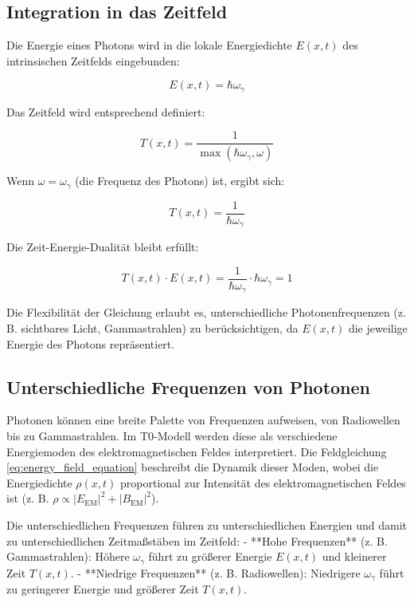 	\subsection{Integration in das Zeitfeld}
	\label{subsec:photon_time_field}
	
	Die Energie eines Photons wird in die lokale Energiedichte \( E(x,t) \) des intrinsischen Zeitfelds eingebunden:
	
	\begin{equation}
		E(x,t) = \hbar \omega_\gamma
	\end{equation}
	
	Das Zeitfeld wird entsprechend definiert:
	
	\begin{equation}
		T(x,t) = \frac{1}{\max(\hbar \omega_\gamma, \omega)}
	\end{equation}
	
	Wenn \(\omega = \omega_\gamma\) (die Frequenz des Photons) ist, ergibt sich:
	
	\begin{equation}
		T(x,t) = \frac{1}{\hbar \omega_\gamma}
	\end{equation}
	
	Die Zeit-Energie-Dualität bleibt erfüllt:
	
	\begin{equation}
		T(x,t) \cdot E(x,t) = \frac{1}{\hbar \omega_\gamma} \cdot \hbar \omega_\gamma = 1
	\end{equation}
	
	Die Flexibilität der Gleichung erlaubt es, unterschiedliche Photonenfrequenzen (z. B. sichtbares Licht, Gammastrahlen) zu berücksichtigen, da \( E(x,t) \) die jeweilige Energie des Photons repräsentiert.
	
	\subsection{Unterschiedliche Frequenzen von Photonen}
	\label{subsec:photon_frequencies}
	
	Photonen können eine breite Palette von Frequenzen aufweisen, von Radiowellen bis zu Gammastrahlen. Im T0-Modell werden diese als verschiedene Energiemoden des elektromagnetischen Feldes interpretiert. Die Feldgleichung \eqref{eq:energy_field_equation} beschreibt die Dynamik dieser Moden, wobei die Energiedichte \(\rho(x,t)\) proportional zur Intensität des elektromagnetischen Feldes ist (z. B. \( \rho \propto |E_{\text{EM}}|^2 + |B_{\text{EM}}|^2 \)).
	
	Die unterschiedlichen Frequenzen führen zu unterschiedlichen Energien und damit zu unterschiedlichen Zeitmaßstäben im Zeitfeld:
	- **Hohe Frequenzen** (z. B. Gammastrahlen): Höhere \(\omega_\gamma\) führt zu größerer Energie \( E(x,t) \) und kleinerer Zeit \( T(x,t) \).
	- **Niedrige Frequenzen** (z. B. Radiowellen): Niedrigere \(\omega_\gamma\) führt zu geringerer Energie und größerer Zeit \( T(x,t) \).
	
